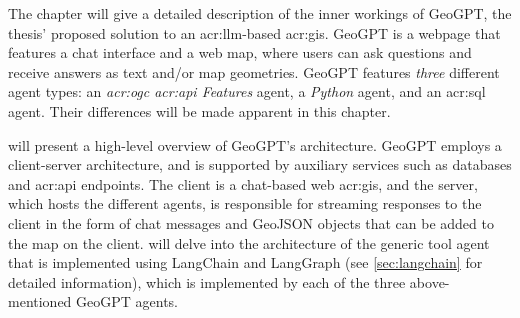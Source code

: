 \begin{comment}
\textit{Phasellus sed ipsum nunc. Nam iaculis felis mauris, sit amet condimentum ex malesuada at. Morbi lacinia odio mi, sit amet pellentesque ante facilisis sit amet. In lobortis elit ut dictum mollis. Aliquam erat volutpat. Morbi sit amet metus nisi. Nulla auctor varius metus at rhoncus. Pellentesque porta mollis leo, eu ultricies nulla mollis ac. Vivamus interdum ac odio vitae sodales. Aenean finibus eros rhoncus molestie elementum. Integer maximus erat vitae purus lobortis iaculis. Etiam blandit varius nulla, sed euismod felis.}

Clearly, a figure showing the architecture is a must, such as Figure~\ref{fig:Architecture}.
Describe all parts of such a figure in reasonable detail in the text, possibly with forward pointers to sections where they will be elaborated on (or backward pointers to sections where tools and methods already have been introduced).
Mention work that motivated your architectural choices, parameter settings, etc.
Those choices should then also be discussed and elaborated on in the Discussion chapter.

\begin{figure}[t!]
    \centering
    \missingfigure{Architecture figure to be added}
    \caption{The missing architecture}
    \label{fig:Architecture}
\end{figure}
\end{comment}

The  chapter will give a detailed description of the inner workings of GeoGPT, the thesis' proposed solution to an \acrshort{acr:llm}-based \acrshort{acr:gis}. GeoGPT is a webpage that features a chat interface and a web map, where users can ask questions and receive answers as text and/or map geometries. GeoGPT features \textit{three} different agent types: an \textit{\acrshort{acr:ogc} \acrshort{acr:api} Features} agent, a \textit{Python} agent, and an \acrshort{acr:sql} agent. Their differences will be made apparent in this chapter.

 will present a high-level overview of GeoGPT's architecture. GeoGPT employs a client-server architecture, and is supported by auxiliary services such as databases and \acrshort{acr:api} endpoints. The client is a chat-based web \acrshort{acr:gis}, and the server, which hosts the different agents, is responsible for streaming responses to the client in the form of chat messages and GeoJSON objects that can be added to the map on the client.  will delve into the architecture of the generic tool agent that is implemented using LangChain and LangGraph (see \autoref{sec:langchain} for detailed information), which is implemented by each of the three above-mentioned GeoGPT agents.

